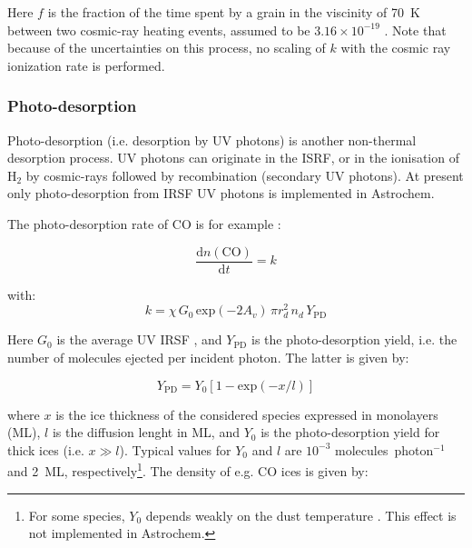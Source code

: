 \documentclass[a4paper,12pt]{article}
\newcommand{\conc}[1]{n(\mathrm{#1})}
\begin{document}
\noindent
Here $f$ is the fraction of the time spent by a grain in the viscinity
of 70~K between two cosmic-ray heating events, assumed to be $3.16
\times 10^{-19}$ \citep{Hasegawa93}. Note that because of the
uncertainties on this process, no scaling of $k$ with the cosmic ray
ionization rate is performed.

\subsubsection{Photo-desorption}
\label{sec:photo-desorption}

Photo-desorption (i.e. desorption by UV photons) is another
non-thermal desorption process. UV photons can originate in the ISRF,
or in the ionisation of H$_{2}$ by cosmic-rays followed by
recombination (secondary UV photons). At present only photo-desorption
from IRSF UV photons is implemented in Astrochem.

The photo-desorption rate of CO is for example
\citep{Oberg09a,Oberg09b}:

\begin{equation}
  \frac{\mathrm{d} \conc{CO}}{\mathrm{d} t} = k
  \label{eq:photo-desorption-rate}
\end{equation}  

with:
\begin{equation}
  k = \chi \, G_{0} \, \mathrm{exp} \left( -2 A_{v} \right)
  \, \pi r_{d}^{2} \, n_{d} \, Y_\mathrm{PD}
  \label{eq:photo-desorption}
\end{equation}

\noindent
Here $G_{0}$ is the average UV IRSF \citep[assumed to be
10$^{8}$~photons~cm$^{-2}$~s$^{-1}$;][]{Habing68}, and $Y_\mathrm{PD}$
is the photo-desorption yield, i.e. the number of molecules ejected
per incident photon. The latter is given by:

\begin{equation}
  Y_\mathrm{PD} = Y_{0} \left[ 1 - \mathrm{exp} \left( -x / l \right) \right]
  \label{eq:photo-desorption-yield}
\end{equation}

\noindent
where $x$ is the ice thickness of the considered species expressed in
monolayers (ML), $l$ is the diffusion lenght in ML, and $Y_{0}$ is the
photo-desorption yield for thick ices (i.e. $x \gg l$). Typical values
for $Y_{0}$ and $l$ are $10^{-3}$ molecules~photon$^{-1}$ and 2~ML,
respectively\footnote{For some species, $Y_{0}$ depends weakly on the
  dust temperature \citep{Oberg09a}. This effect is not implemented in
  Astrochem.}. The density of e.g. CO ices is given by:
\end{document}
